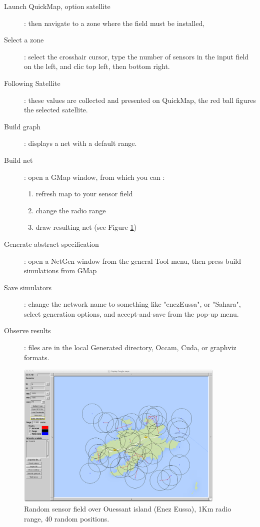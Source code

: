 \begin{description}
\item [Launch QuickMap, option satellite] : then navigate to a zone where the field must be installed,
\item [Select a zone ]: select the crosshair cursor, type the number of sensors in the input field on the left, and clic top left, then bottom right.
\item [Following Satellite ]: these values are collected and presented on QuickMap, the red ball figures the selected satellite.
\item [Build graph ]:  displays a net with a default range.
\item [Build net ]:  open a GMap window, from which you can :
\begin{enumerate}
\item refresh map to your sensor field
\item change the radio range
\item draw resulting net (see Figure \ref{fig:enezEussa})
\end{enumerate}
\item [Generate abstract specification ]: open a NetGen window from the general Tool menu, then press build simulations from GMap
\item [Save simulators ]: change the network name to something like "enezEussa", or "Sahara", select generation options, and accept-and-save from the pop-up menu.
\item [Observe results ]:  files are in the local Generated directory, Occam, Cuda, or graphviz formats.
\end{description}



\begin{figure}[hbtp]
\begin{center}
\includegraphics[width=10cm]{enezEussa.png}
\caption{Random sensor field over Ouessant island (Enez Eussa), 1Km radio range, 40 random positions.}
\label{fig:enezEussa}
\end{center}
\end{figure}
